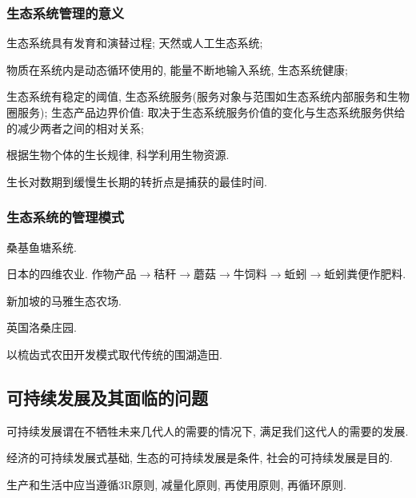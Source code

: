 \documentclass{ctexart}
\begin{document}
\subsubsection{生态系统管理的意义} %
\label{ssub:生态系统管理的意义}

\begin{cenum}
    \item 生态系统具有发育和演替过程; 天然或人工生态系统;
    \item 物质在系统内是动态循环使用的, 能量不断地输入系统, 生态系统健康;
    \item 生态系统有稳定的阈值, 生态系统服务(服务对象与范围如生态系统内部服务和生物圈服务); 生态产品边界价值: 取决于生态系统服务价值的变化与生态系统服务供给的减少两者之间的相对关系;
    \item 根据生物个体的生长规律, 科学利用生物资源.
\end{cenum}
\begin{ex}
    生长对数期到缓慢生长期的转折点是捕获的最佳时间. 
\end{ex}


\subsubsection{生态系统的管理模式} %
\label{ssub:生态系统的管理模式}

\begin{ex}
    桑基鱼塘系统.
\end{ex}
\begin{ex}
    日本的四维农业. 作物产品$\rightarrow$秸秆$\rightarrow$蘑菇$\rightarrow$牛饲料$\rightarrow$蚯蚓$\rightarrow$蚯蚓粪便作肥料.
\end{ex}
\begin{ex}
    新加坡的马雅生态农场.
\end{ex}
\begin{ex}
    英国洛桑庄园.
\end{ex}
\begin{ex}
    以梳齿式农田开发模式取代传统的围湖造田.
\end{ex}



\subsection{可持续发展及其面临的问题} %
\label{sub:可持续发展及其面临的问题}

可持续发展谓在不牺牲未来几代人的需要的情况下, 满足我们这代人的需要的发展.
\par
经济的可持续发展式基础, 生态的可持续发展是条件, 社会的可持续发展是目的.
\par
生产和生活中应当遵循3R原则, 减量化原则, 再使用原则, 再循环原则.


\end{document}
